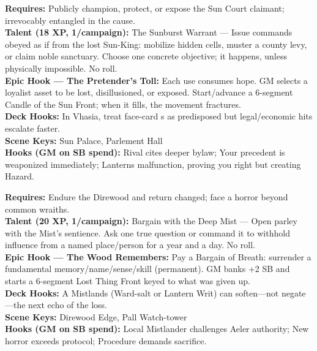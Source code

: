 \documentclass[12pt]{article}
\begin{document}
\begin{description}[leftmargin=*]
  \item[\textbf{The Last Dauphin's Shadow}] 
  \textbf{Requires:} Publicly champion, protect, or expose the Sun Court claimant; irrevocably entangled in the cause. \\
  \textbf{Talent (18 XP, 1/campaign):} The Sunburst Warrant --- Issue commands obeyed as if from the lost Sun-King: mobilize hidden cells, muster a county levy, or claim noble sanctuary. Choose one concrete objective; it happens, unless physically impossible. No roll. \\
  \textbf{Epic Hook --- The Pretender's Toll:} Each use consumes hope. GM selects a loyalist asset to be lost, disillusioned, or exposed. Start/advance a 6-segment Candle of the Sun Front; when it fills, the movement fractures. \\
  \textbf{Deck Hooks:} In Vhasia, treat face-card s as predisposed but legal/economic hits escalate faster. \\
  \textbf{Scene Keys:} Sun Palace, Parlement Hall \\
  \textbf{Hooks (GM on SB spend):} Rival cites deeper bylaw; Your precedent is weaponized immediately; Lanterns malfunction, proving you right but creating Hazard.

  \item[\textbf{Mist-Seer of the Weeping Gate}] 
  \textbf{Requires:} Endure the Direwood and return changed; face a horror beyond common wraiths. \\
  \textbf{Talent (20 XP, 1/campaign):} Bargain with the Deep Mist --- Open parley with the Mist's sentience. Ask one true question or command it to withhold influence from a named place/person for a year and a day. No roll. \\
  \textbf{Epic Hook --- The Wood Remembers:} Pay a Bargain of Breath: surrender a fundamental memory/name/sense/skill (permanent). GM banks +2 SB and starts a 6-segment Lost Thing Front keyed to what was given up. \\
  \textbf{Deck Hooks:} A Mistlands (Ward-salt or Lantern Writ) can soften---not negate---the next echo of the loss. \\
  \textbf{Scene Keys:} Direwood Edge, Pall Watch-tower \\
  \textbf{Hooks (GM on SB spend):} Local Mistlander challenges Aeler authority; New horror exceeds protocol; Procedure demands sacrifice.


\end{description}
\end{document}
